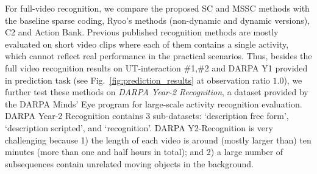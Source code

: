 For full-video recognition, we compare the proposed SC and MSSC methods with
the baseline sparse coding, Ryoo's methods (non-dynamic and dynamic versions),
C2 and Action Bank.  Previous published recognition methods are mostly
evaluated on short video clips where each of them contains a single activity,
which cannot reflect {\color{black}real performance} in the practical
scenarios.  Thus, besides the full video recognition results on UT-interaction
\#1,\#2 and DARPA Y1 provided in prediction task (see
Fig.~\ref{fig:prediction_results} at observation ratio $1.0$), we further test
these methods on \textit{DARPA Year-2 Recognition}, a dataset provided by the
DARPA Minds' Eye program for large-scale activity recognition evaluation. DARPA
Year-2 Recognition contains $3$ sub-datasets: `description free form',
`description scripted', and `recognition'. DARPA Y2-Recognition is very
challenging because 1) the length of each video is around (mostly larger than)
ten minutes (more than one and half hours in total); and 2) a large number of
subsequences contain unrelated moving objects in the background.

